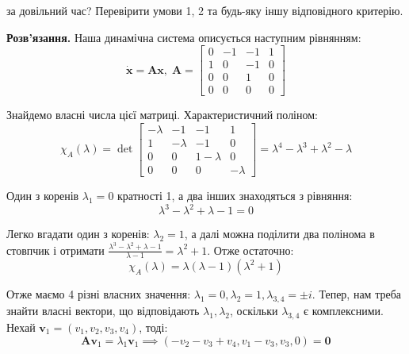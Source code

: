 \documentclass[oneside,solution]{karazin-control-assign}
\begin{document}
за довільний час? Перевірити умови 1, 2 та будь-яку іншу відповідного критерію.

\textbf{Розв'язання.} Наша динамічна система описується наступним рівнянням:
\begin{equation}
    \dot{\mathbf{x}} = \boldsymbol{A}\mathbf{x}, \; \boldsymbol{A} = \begin{bmatrix}
        0 & -1 & -1 & 1 \\
        1 & 0 & -1 & 0 \\
        0 & 0 & 1 & 0\\
        0 & 0 & 0 & 0
    \end{bmatrix}
\end{equation}

Знайдемо власні числа цієї матриці. Характеристичний поліном:
\begin{equation}
    \chi_A(\lambda) = \det \begin{bmatrix}
        -\lambda & -1 & -1 & 1 \\
        1 & -\lambda & -1 & 0 \\
        0 & 0 & 1-\lambda & 0 \\
        0 & 0 & 0 & -\lambda
    \end{bmatrix} = \lambda^4 - \lambda^3 + \lambda^2 - \lambda
\end{equation}

Один з коренів $\lambda_1=0$ кратності 1, а два інших знаходяться з рівняння:
\begin{equation}
    \lambda^3 - \lambda^2 + \lambda - 1 = 0
\end{equation}

Легко вгадати один з коренів: $\lambda_2=1$, а далі можна поділити два полінома в стовпчик і отримати $\frac{\lambda^3-\lambda^2+\lambda-1}{\lambda-1} = \lambda^2+1$. Отже остаточно:
\begin{equation}
    \chi_A(\lambda) = \lambda(\lambda-1)(\lambda^2+1)
\end{equation}

Отже маємо 4 різні власних значення: $\lambda_1=0,\lambda_2=1,\lambda_{3,4}=\pm i$. Тепер, нам треба знайти власні вектори, що відповідають $\lambda_1,\lambda_2$, оскільки $\lambda_{3,4}$ є комплексними. Нехай $\mathbf{v}_1=(v_1,v_2,v_3,v_4)$, тоді:
\begin{equation}
    \boldsymbol{A}\mathbf{v}_1 = \lambda_1\mathbf{v}_1 \implies (
        -v_2 - v_3 + v_4,
        v_1 - v_3,
        v_3,
        0
    ) = \mathbf{0}
\end{equation}
\end{document}
